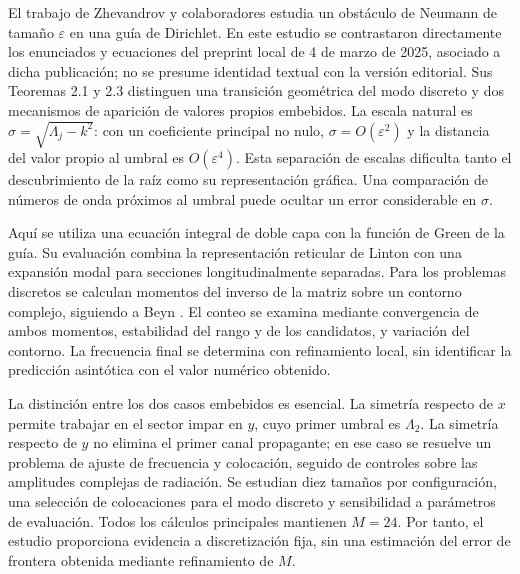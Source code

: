 \documentclass[11pt]{article}
\newcommand{\eps}{\varepsilon}
\begin{document}
El trabajo de Zhevandrov y colaboradores \cite{Zhevandrov2025} estudia un obstáculo de Neumann de tamaño $\eps$ en una guía de Dirichlet. En este estudio se contrastaron directamente los enunciados y ecuaciones del preprint local de 4 de marzo de 2025, asociado a dicha publicación; no se presume identidad textual con la versión editorial. Sus Teoremas 2.1 y 2.3 distinguen una transición geométrica del modo discreto y dos mecanismos de aparición de valores propios embebidos. La escala natural es $\sigma=\sqrt{\Lambda_j-k^2}$: con un coeficiente principal no nulo, $\sigma=O(\eps^2)$ y la distancia del valor propio al umbral es $O(\eps^4)$. Esta separación de escalas dificulta tanto el descubrimiento de la raíz como su representación gráfica. Una comparación de números de onda próximos al umbral puede ocultar un error considerable en $\sigma$.

Aquí se utiliza una ecuación integral de doble capa con la función de Green de la guía. Su evaluación combina la representación reticular de Linton \cite{Linton1998Green} con una expansión modal para secciones longitudinalmente separadas. Para los problemas discretos se calculan momentos del inverso de la matriz sobre un contorno complejo, siguiendo a Beyn \cite{Beyn2012}. El conteo se examina mediante convergencia de ambos momentos, estabilidad del rango y de los candidatos, y variación del contorno. La frecuencia final se determina con refinamiento local, sin identificar la predicción asintótica con el valor numérico obtenido.

La distinción entre los dos casos embebidos es esencial. La simetría respecto de $x$ permite trabajar en el sector impar en $y$, cuyo primer umbral es $\Lambda_2$. La simetría respecto de $y$ no elimina el primer canal propagante; en ese caso se resuelve un problema de ajuste de frecuencia y colocación, seguido de controles sobre las amplitudes complejas de radiación. Se estudian diez tamaños por configuración, una selección de colocaciones para el modo discreto y sensibilidad a parámetros de evaluación. Todos los cálculos principales mantienen $M=24$. Por tanto, el estudio proporciona evidencia a discretización fija, sin una estimación del error de frontera obtenida mediante refinamiento de $M$.
\end{document}
